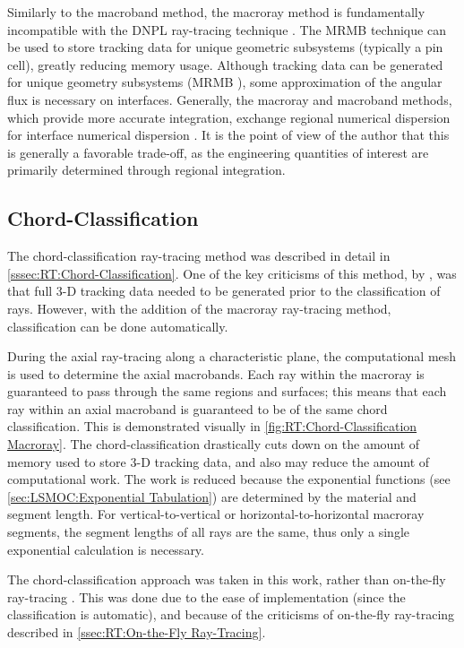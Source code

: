 {{    Similarly to the macroband method, the macroray method is fundamentally incompatible with the \acf{DNPL} ray-tracing technique \cite{Saji2000}.
    The \acf{MRMB} technique \cite{Yamamoto2005} can be used to store tracking data for unique geometric subsystems (typically a pin cell), greatly reducing memory usage.
    Although tracking data can be generated for unique geometry subsystems (\ac{MRMB} \cite{Yamamoto2005}), some approximation of the angular flux is necessary on interfaces.
    Generally, the macroray and macroband methods, which provide more accurate integration, exchange regional numerical dispersion for interface numerical dispersion \cite{Sanchez2012}.
    It is the point of view of the author that this is generally a favorable trade-off, as the engineering quantities of interest are primarily determined through regional integration.

    \subsection{Chord-Classification}{\label{ssec:MR:Chord-Classification}
      The chord-classification ray-tracing method \cite{Sciannandrone2016} was described in detail in \cref{sssec:RT:Chord-Classification}.
      One of the key criticisms of this method, by \citet{Gunow2018}, was that full 3-D tracking data needed to be generated prior to the classification of rays.
      However, with the addition of the macroray ray-tracing method, classification can be done automatically.

      During the axial ray-tracing along a characteristic plane, the computational mesh is used to determine the axial macrobands.
      Each ray within the macroray is guaranteed to pass through the same regions and surfaces; this means that each ray within an axial macroband is guaranteed to be of the same chord classification.
      This is demonstrated visually in \cref{fig:RT:Chord-Classification Macroray}.
      The chord-classification drastically cuts down on the amount of memory used to store 3-D tracking data, and also may reduce the amount of computational work.
      The work is reduced because the exponential functions (see \cref{sec:LSMOC:Exponential Tabulation}) are determined by the material and segment length.
      For vertical-to-vertical or horizontal-to-horizontal macroray segments, the segment lengths of all rays are the same, thus only a single exponential calculation is necessary.

      The chord-classification approach was taken in this work, rather than on-the-fly ray-tracing \cite{Gunow2018}.
      This was done due to the ease of implementation (since the classification is automatic), and because of the criticisms of on-the-fly ray-tracing described in \cref{ssec:RT:On-the-Fly Ray-Tracing}.

}}}
